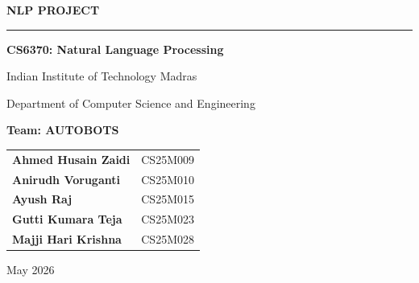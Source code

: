 \documentclass{svproc}
\begin{document}
    \pagestyle{empty}

    \begin{titlepage}
    \centering

    \vspace*{1.5cm}

    {\fontsize{42}{50}\selectfont\bfseries NLP PROJECT\par}

    \vspace{1.2cm}
    \rule{0.6\linewidth}{2pt}
    \vspace{0.8cm}

    {\LARGE\bfseries CS6370: Natural Language Processing\par}
    \vspace{0.3cm}
    {\large Indian Institute of Technology Madras\par}
    \vspace{0.15cm}
    {\normalsize Department of Computer Science and Engineering\par}

    \vspace{1.5cm}

    {\Large\bfseries Team: AUTOBOTS\par}

    \vspace{1cm}

    {\large
    \renewcommand{\arraystretch}{1.5}%
    \begin{tabular}{@{}ll@{}}
    \textbf{Ahmed Husain Zaidi}  & CS25M009 \\
    \textbf{Anirudh Voruganti}   & CS25M010 \\
    \textbf{Ayush Raj}           & CS25M015 \\
    \textbf{Gutti Kumara Teja}   & CS25M023 \\
    \textbf{Majji Hari Krishna}  & CS25M028 \\
    \end{tabular}\par}

    \vfill
    {\normalsize May 2026\par}

    \end{titlepage}
\end{document}
